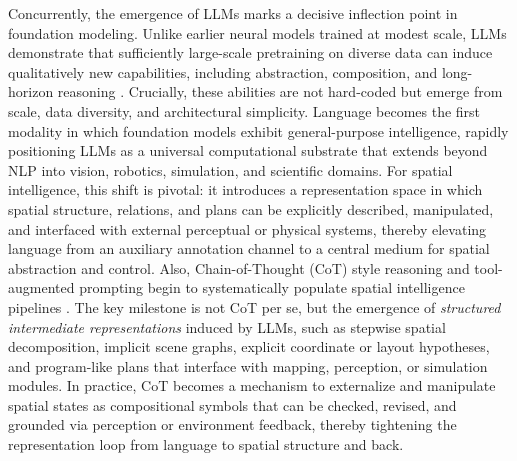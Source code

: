 Concurrently, the emergence of LLMs marks a decisive inflection point in foundation modeling.
Unlike earlier neural models trained at modest scale, LLMs demonstrate that sufficiently large-scale pretraining on diverse data can induce qualitatively new capabilities, including abstraction, composition, and long-horizon reasoning \cite{achiam2023gpt,vicuna2023}.
Crucially, these abilities are not hard-coded but emerge from scale, data diversity, and architectural simplicity.
Language becomes the first modality in which foundation models exhibit general-purpose intelligence, rapidly positioning LLMs as a universal computational substrate that extends beyond NLP into vision, robotics, simulation, and scientific domains.
For spatial intelligence, this shift is pivotal: it introduces a representation space in which spatial structure, relations, and plans can be explicitly described, manipulated, and interfaced with external perceptual or physical systems, thereby elevating language from an auxiliary annotation channel to a central medium for spatial abstraction and control.
Also, Chain-of-Thought (CoT) style reasoning and tool-augmented prompting begin to systematically populate spatial intelligence pipelines \cite{wei2022chain}.
The key milestone is not CoT per se, but the emergence of \emph{structured intermediate representations} induced by LLMs, such as stepwise spatial decomposition, implicit scene graphs, explicit coordinate or layout hypotheses, and program-like plans that interface with mapping, perception, or simulation modules.
In practice, CoT becomes a mechanism to externalize and manipulate spatial states as compositional symbols that can be checked, revised, and grounded via perception or environment feedback, thereby tightening the representation loop from language to spatial structure and back.







